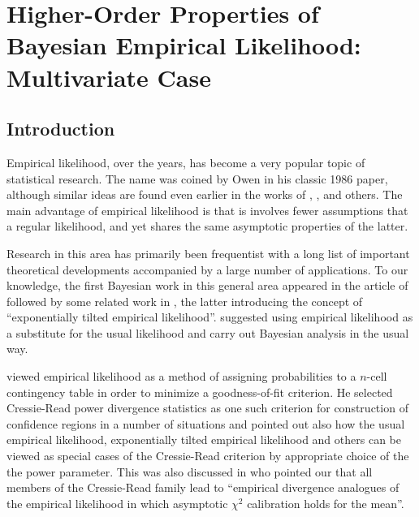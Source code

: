 \chapter{Higher-Order Properties of Bayesian Empirical Likelihood: Multivariate
Case}


\section{Introduction}

Empirical likelihood, over the years, has become a very popular topic
of statistical research. The name was coined by Owen in his classic
1986 paper, although similar ideas are found even earlier in the works
of \citet{hartley1968new}, \citet{thomas1975confidence}, \citet{rubin1981bayesian}
and others. The main advantage of empirical likelihood is that is
involves fewer assumptions that a regular likelihood, and yet shares
the same asymptotic properties of the latter. 

Research in this area has primarily been frequentist with a long list
of important theoretical developments accompanied by a large number
of applications. To our knowledge, the first Bayesian work in this
general area appeared in the article of \citet{lazar2003bayesian}
followed by some related work in \citet{schennach2005bayesian,schennach2007point}
, the latter introducing the concept of ``exponentially tilted empirical
likelihood''. \citet{lazar2003bayesian} suggested using empirical
likelihood as a substitute for the usual likelihood and carry out
Bayesian analysis in the usual way. 

\citet{baggerly1998empirical} viewed empirical likelihood as a method
of assigning probabilities to a $n$-cell contingency table in order
to minimize a goodness-of-fit criterion. He selected Cressie-Read
power divergence statistics as one such criterion for construction
of confidence regions in a number of situations and pointed out also
how the usual empirical likelihood, exponentially tilted empirical
likelihood and others can be viewed as special cases of the Cressie-Read
criterion by appropriate choice of the the power parameter. This was
also discussed in \citet{owen2010empirical} who pointed our that
all members of the Cressie-Read family lead to ``empirical divergence
analogues of the empirical likelihood in which asymptotic $\chi^{2}$
calibration holds for the mean''.

